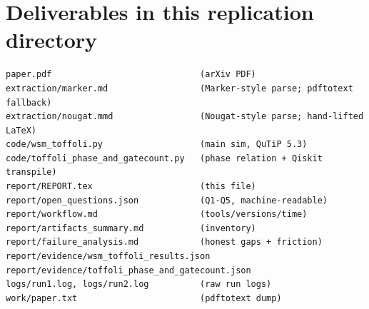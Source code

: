 \documentclass[11pt]{article}
\begin{document}
\section*{Deliverables in this replication directory}

\begin{lstlisting}
paper.pdf                             (arXiv PDF)
extraction/marker.md                  (Marker-style parse; pdftotext fallback)
extraction/nougat.mmd                 (Nougat-style parse; hand-lifted LaTeX)
code/wsm_toffoli.py                   (main sim, QuTiP 5.3)
code/toffoli_phase_and_gatecount.py   (phase relation + Qiskit transpile)
report/REPORT.tex                     (this file)
report/open_questions.json            (Q1-Q5, machine-readable)
report/workflow.md                    (tools/versions/time)
report/artifacts_summary.md           (inventory)
report/failure_analysis.md            (honest gaps + friction)
report/evidence/wsm_toffoli_results.json
report/evidence/toffoli_phase_and_gatecount.json
logs/run1.log, logs/run2.log          (raw run logs)
work/paper.txt                        (pdftotext dump)
\end{lstlisting}
\end{document}
